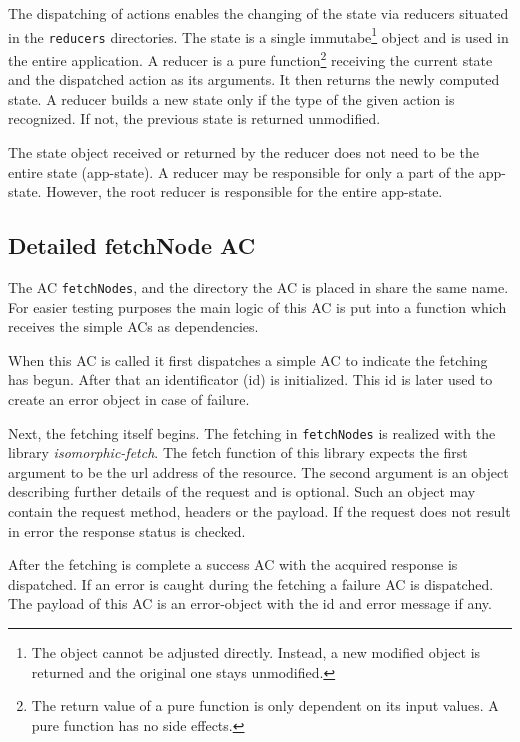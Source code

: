 \begin{appendices}
The dispatching of actions enables the changing of the state via reducers situated in the \texttt{reducers} directories. The state is a single immutabe\footnote{The object cannot be adjusted directly. Instead, a new modified object is returned and the original one stays unmodified.} object and is used in the entire application. A \hypertarget{reducers}{reducer} is a pure function\footnote{The return value of a pure function is only dependent on its input values. A pure function has no side effects.} receiving the current state and the dispatched action as its arguments. It then returns the newly computed state. A reducer builds a new state only if the type of the given action is recognized. If not, the previous state is returned unmodified. 

The state object received or returned by the reducer does not need to be the entire state (app-state). A reducer may be responsible for only a part of the app-state. However, the root reducer is responsible for the entire app-state.

\subsection{Detailed fetchNode AC}\label{dixComplicatedAC}
The AC \texttt{fetchNodes}, and the directory the AC is placed in share the same name. For easier testing purposes the main logic of this AC is put into a function which receives the simple ACs as dependencies. 

When this AC is called it first dispatches a simple AC to indicate the fetching has begun. After that an identificator (id) is initialized. This id is later used to create an error object in case of failure.

 Next, the fetching itself begins. The fetching in \texttt{fetchNodes} is realized with the library \textit{isomorphic-fetch}. The fetch function of this library expects the first argument to be the url address of the resource. The second argument is an object describing further details of the request and is optional. Such an object may contain the request method, headers or the payload. If the request does not result in error the response status is checked. 

After the fetching is complete a success AC with the acquired response is dispatched. If an error is caught during the fetching a failure AC is dispatched. The payload of this AC is an error-object with the id and error message if any.


\end{appendices}